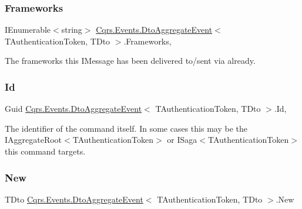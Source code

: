 \subsubsection{\texorpdfstring{Frameworks}{Frameworks}}
{\footnotesize\ttfamily I\+Enumerable$<$string$>$ \hyperlink{classCqrs_1_1Events_1_1DtoAggregateEvent}{Cqrs.\+Events.\+Dto\+Aggregate\+Event}$<$ T\+Authentication\+Token, T\+Dto $>$.Frameworks\hspace{0.3cm}{\ttfamily [get]}, {\ttfamily [set]}}



The frameworks this I\+Message has been delivered to/sent via already. 

\mbox{\label{classCqrs_1_1Events_1_1DtoAggregateEvent_ad5f763ecd79dc9b4882ed15239242d17_ad5f763ecd79dc9b4882ed15239242d17}} 
\subsubsection{\texorpdfstring{Id}{Id}}
{\footnotesize\ttfamily Guid \hyperlink{classCqrs_1_1Events_1_1DtoAggregateEvent}{Cqrs.\+Events.\+Dto\+Aggregate\+Event}$<$ T\+Authentication\+Token, T\+Dto $>$.Id\hspace{0.3cm}{\ttfamily [get]}, {\ttfamily [set]}}



The identifier of the command itself. In some cases this may be the I\+Aggregate\+Root$<$\+T\+Authentication\+Token$>$ or I\+Saga$<$\+T\+Authentication\+Token$>$ this command targets. 

\mbox{\label{classCqrs_1_1Events_1_1DtoAggregateEvent_a702bd5605d7ce538b992c2d43198194c_a702bd5605d7ce538b992c2d43198194c}} 
\subsubsection{\texorpdfstring{New}{New}}
{\footnotesize\ttfamily T\+Dto \hyperlink{classCqrs_1_1Events_1_1DtoAggregateEvent}{Cqrs.\+Events.\+Dto\+Aggregate\+Event}$<$ T\+Authentication\+Token, T\+Dto $>$.New\hspace{0.3cm}{\ttfamily [get]}}



